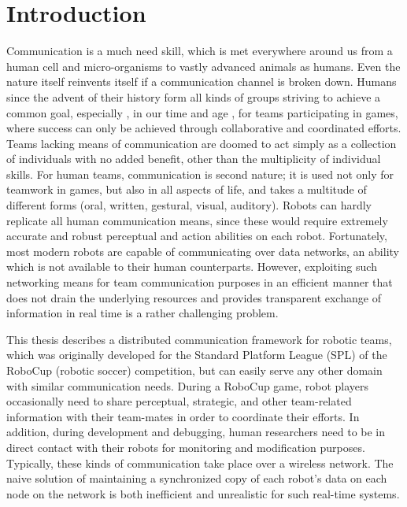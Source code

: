 \chapter{Introduction}
\label{intro}
Communication is a much need skill, which is met everywhere around us from a human cell and micro-organisms to vastly advanced animals as humans. Even the nature itself reinvents itself if a communication channel is broken down. Humans since the advent of their history form all kinds of groups striving to achieve a common goal, especially , in our time and age ,
for teams participating in games, where success can only be achieved through collaborative and coordinated efforts.
Teams lacking means of communication are doomed to act simply as a collection of individuals with no added benefit,
other than the multiplicity of individual skills. For human teams, communication is second nature; it is used not only
for teamwork in games, but also in all aspects of life, and takes a multitude of different forms (oral, written,
gestural, visual, auditory). Robots can hardly replicate all human communication means, since these would require
extremely accurate and robust perceptual and action abilities on each robot. Fortunately, most modern robots are capable
of communicating over data networks, an ability which is not available to their human counterparts. However, exploiting
such networking means for team communication purposes in an efficient manner that does not drain the underlying
resources and provides transparent exchange of information in real time is a rather challenging problem. 


This thesis describes a distributed communication framework for robotic teams, which was originally developed for the
Standard Platform League (SPL) of the RoboCup (robotic soccer) competition, but can easily serve any other domain with
similar communication needs. During a RoboCup game, robot players occasionally need to share perceptual, strategic, and
other team-related information with their team-mates in order to coordinate their efforts. In addition, during
development and debugging, human researchers need to be in direct contact with their robots for monitoring and
modification purposes. Typically, these kinds of communication take place over a wireless network. The naive solution of
maintaining a synchronized copy of each robot's data on each node on the network is both inefficient and unrealistic for
such real-time systems. 

